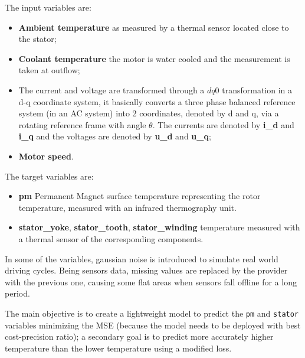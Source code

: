 The input variables are:
\begin{itemize}[topsep=0ex, noitemsep]
    \item \textbf{Ambient temperature} as measured by a thermal sensor located close to the stator;
    \item \textbf{Coolant temperature} the motor is water cooled and the measurement is taken at outflow;
    \item The current and voltage are transformed through a $dq0$ transformation in a d-q coordinate system, it basically converts a three phase balanced reference system (in an AC system) into 2 coordinates, denoted by d and q, via a rotating reference frame with angle $\theta$.
    The currents are denoted by \textbf{i\_d} and \textbf{i\_q} and the voltages are denoted by \textbf{u\_d} and \textbf{u\_q};
    \item \textbf{Motor speed}.
\end{itemize}

The target variables are:
\begin{itemize}[topsep=0ex, noitemsep]
    \item \textbf{pm} Permanent Magnet surface temperature representing the rotor temperature, measured with an infrared thermography unit.
    \item \textbf{stator\_yoke}, \textbf{stator\_tooth}, \textbf{stator\_winding} temperature measured with a thermal sensor of the corresponding components.
\end{itemize}
In some of the variables, gaussian noise is introduced to simulate real world driving cycles. Being sensors data, missing values are replaced by the provider with the previous one, causing some flat areas when sensors fall offline for a long period. 

The main objective is to create a lightweight model to predict the \verb|pm| and \verb|stator| variables minimizing the MSE (because the model needs to be deployed with best cost-precision ratio); a secondary goal is to predict more accurately higher temperature than the lower temperature using a modified loss.

